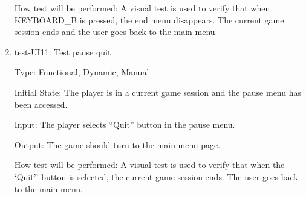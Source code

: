 \documentclass[12pt, titlepage]{article}
\begin{document}
\begin{enumerate}
How test will be performed: A visual test is used to verify that when KEYBOARD\_B is pressed, the end menu disappears. The current game session ends and the user goes back to the main menu.	

\item{test-UI11: Test pause quit\\}

Type: Functional, Dynamic, Manual
					
Initial State: The player is in a current game session and the pause menu has been accessed.
					
Input: The player selects ``Quit'' button in the pause menu.
					
Output: The game should turn to the main menu page.
					
How test will be performed: A visual test is used to verify that when the `Quit'' button is selected, the current game session ends. The user goes back to the main menu.	
\end{enumerate}
\end{document}
